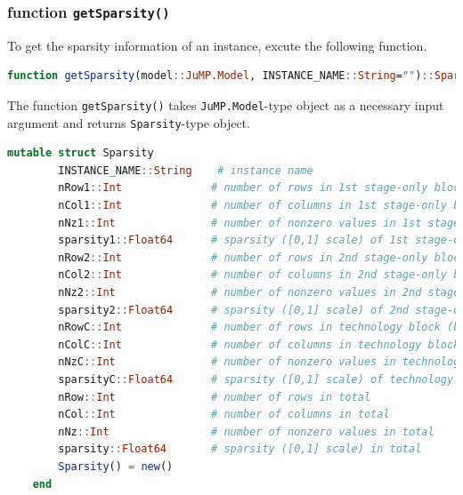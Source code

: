 \documentclass{hitec}
\newcommand{\jumpmodel}{\texttt{JuMP.Model}}
\begin{document}
	\subsubsection{function \texttt{getSparsity()}}
	To get the sparsity information of an instance, excute the following function.
	\begin{lstlisting}[frame=single,language=julia]
	function getSparsity(model::JuMP.Model, INSTANCE_NAME::String="")::Sparsity
	\end{lstlisting}
	The function \texttt{getSparsity()} takes \jumpmodel-type object as a necessary input argument and returns \texttt{Sparsity}-type object.
	\begin{lstlisting}[frame=single,language=julia]
	mutable struct Sparsity
		INSTANCE_NAME::String    # instance name
		nRow1::Int              # number of rows in 1st stage-only block (block A)
		nCol1::Int              # number of columns in 1st stage-only block (block A)
		nNz1::Int               # number of nonzero values in 1st stage-only block (block A)
		sparsity1::Float64      # sparsity ([0,1] scale) of 1st stage-only block (block A)
		nRow2::Int              # number of rows in 2nd stage-only block (block W)
		nCol2::Int              # number of columns in 2nd stage-only block (block W)
		nNz2::Int               # number of nonzero values in 2nd stage-only block (block W)
		sparsity2::Float64      # sparsity ([0,1] scale) of 2nd stage-only block (block W)
		nRowC::Int              # number of rows in technology block (block T)
		nColC::Int              # number of columns in technology block (block T)
		nNzC::Int               # number of nonzero values in technology block (block T)  
		sparsityC::Float64      # sparsity ([0,1] scale) of technology block (block T)
		nRow::Int               # number of rows in total
		nCol::Int               # number of columns in total
		nNz::Int                # number of nonzero values in total
		sparsity::Float64       # sparsity ([0,1] scale) in total
		Sparsity() = new()
	end
	\end{lstlisting}
	
	\pagebreak
\end{document}

